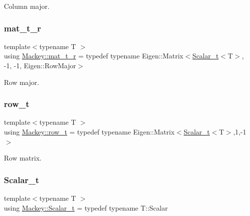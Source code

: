 Column major. 

\mbox{\label{namespaceMackey_ac1c9f85957dda772ceaa564cb23494cb}} 
\subsubsection{\texorpdfstring{mat\+\_\+t\+\_\+r}{mat\_t\_r}}
{\footnotesize\ttfamily template$<$typename T $>$ \\
using \hyperlink{namespaceMackey_ac1c9f85957dda772ceaa564cb23494cb}{Mackey\+::mat\+\_\+t\+\_\+r} = typedef typename Eigen\+::\+Matrix$<$\hyperlink{namespaceMackey_a93ba297573961f91101fb84bc84bbe95}{Scalar\+\_\+t}$<$T$>$, -\/1, -\/1, Eigen\+::\+Row\+Major$>$}



Row major. 

\mbox{\label{namespaceMackey_a6d37801553e585770ca7d1243ab3b213}} 
\subsubsection{\texorpdfstring{row\+\_\+t}{row\_t}}
{\footnotesize\ttfamily template$<$typename T $>$ \\
using \hyperlink{namespaceMackey_a6d37801553e585770ca7d1243ab3b213}{Mackey\+::row\+\_\+t} = typedef typename Eigen\+::\+Matrix$<$\hyperlink{namespaceMackey_a93ba297573961f91101fb84bc84bbe95}{Scalar\+\_\+t}$<$T$>$,1,-\/1$>$}



Row matrix. 

\mbox{\label{namespaceMackey_a93ba297573961f91101fb84bc84bbe95}} 
\subsubsection{\texorpdfstring{Scalar\+\_\+t}{Scalar\_t}}
{\footnotesize\ttfamily template$<$typename T $>$ \\
using \hyperlink{namespaceMackey_a93ba297573961f91101fb84bc84bbe95}{Mackey\+::\+Scalar\+\_\+t} = typedef typename T\+::\+Scalar}



